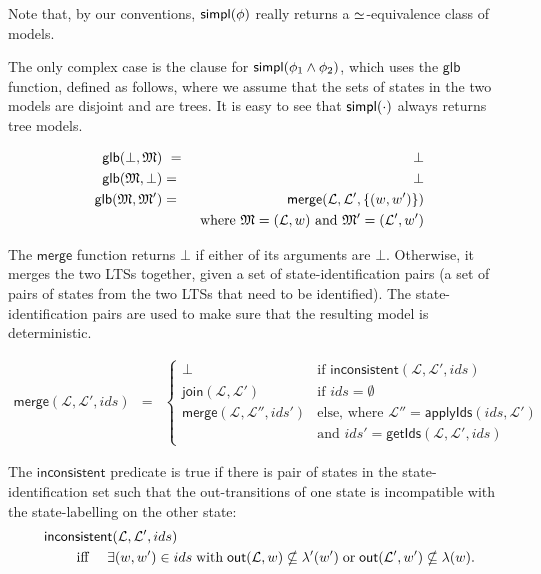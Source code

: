 

\NI Note that, by our conventions, $\mathsf{simpl}(\phi)$ really returns a
$\simeq$-equivalence class of models.

The only complex case is the clause for $\mathsf{simpl}(\phi_1 \land \phi_2)$,
which uses the $\mathsf{glb}$ function, defined as follows, where we assume
that the sets of states in the two models are disjoint and are trees.
It is easy to see that $\mathsf{simpl}(\cdot)$ always returns tree models.

\begin{eqnarray*}
  \mathsf{glb}(\bot, \frak{M})  &\ =\ &  \bot  \\
  \mathsf{glb}(\frak{M}, \bot)      & = &  \bot  
     \\
  \mathsf{glb}(\frak{M}, \frak{M}')
     & = & 
     \mathsf{merge}(\mathcal{L}, \mathcal{L}', \{(w,w')\}) 
     \\
     & & \text{where } \frak{M} = (\mathcal{L}, w) \text{ and } \frak{M}' = (\mathcal{L'}, w')
\end{eqnarray*}

\NI The $\mathsf{merge}$ function returns $\bot$ if either of its arguments are $\bot$. Otherwise, it merges the two LTSs together, given a set of state-identification pairs (a set of pairs of states from the two LTSs that need to be identified).
The state-identification pairs are used to make sure that the resulting model is deterministic.

\begin{eqnarray*}
  \mathsf{merge}(\mathcal{L}, \mathcal{L}', ids) 
     & = & 
  \begin{cases}
    \bot & \text{if } \mathsf{inconsistent}(\mathcal{L}, \mathcal{L}', ids)  \\
    \mathsf{join}(\mathcal{L}, \mathcal{L}') & \text{if } ids = \emptyset  \\
    \mathsf{merge}(\mathcal{L}, \mathcal{L}'', ids')  & \text{else, where }
          \mathcal{L}'' = \mathsf{applyIds}(ids, \mathcal{L}') \\
          & \text{and } ids' = \mathsf{getIds}(\mathcal{L}, \mathcal{L}', ids)
  \end{cases}
\end{eqnarray*}

\NI The $\mathsf{inconsistent}$ predicate is true if there is pair of
states in the state-identification set such that the out-transitions
of one state is incompatible with the state-labelling on the other
state:
\begin{eqnarray*}
  \lefteqn{\mathsf{inconsistent}(\mathcal{L}, \mathcal{L}', ids)}\qquad
     \\
     &\text{ iff }& \exists (w,w') \in ids \; \text{with} \; \mathsf{out}(\mathcal{L},w) \nsubseteq \lambda'(w') \; \text{or} \; \mathsf{out}(\mathcal{L}',w') \nsubseteq \lambda(w).
\end{eqnarray*}
 
